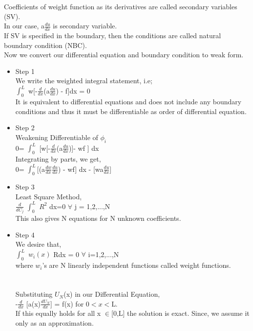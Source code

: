 \documentclass{article}
\begin{document}
	
	Coefficients of weight function as its derivatives are called secondary variables (SV).\\
	In our case, a$\frac{du}{dx}$ is secondary variable.\\
	If SV is specified in the boundary, then the conditions are called natural boundary condition (NBC).\\
	Now we convert our differential equation and boundary condition to weak form.\\
	\begin{itemize}
		\item Step 1\\
		   We write the weighted integral statement, i.e;\\
		   $\int_{0}^{L}$ w[-$\frac{d}{dx}$(a$\frac{du}{dx}$) - f]dx = 0\\
		   It is equivalent to differential equations and does not include any boundary conditions and thus it must be differentiable as order of differential equation.
		 \item Step 2\\
		 Weakening Differentiable of $\phi_{i}$\\
		 0= $\int_{0}^{L}$ [w[-$\frac{d}{dx}$(a$\frac{du}{dx}$)]- wf ] dx\\
		 Integrating by parts, we get,\\
		 0= $\int_{0}^{L}$[(a$\frac{dw}{dx}$$\frac{du}{dx}$) - wf] dx - [wa$\frac{du}{dx}$]\\
		 \item Step 3\\
		 Least Square Method,\\
		 $\frac{d}{dC_j}$ $\int_{0}^{L}$ $R^2$ dx=0 $\forall$ j = 1,2,...,N\\
		 This also gives N equations for N unknown coefficients.\\
		 \item Step 4\\
		 We desire that,\\
		 $\int_{0}^{L}$ $w_i(x)$ Rdx =  0 $\forall$ i=1,2,...,N\\
		 where $w_i$'s are N linearly independent functions called weight functions.\\
		 \\
		 \\
		 Substituting  $U_N$(x) in our Differential Equation,\\
		 -$\frac{d}{dx}$ [a(x)$\frac{dU_N}{dx}$] = f(x) for 0$<x<$L.\\
		 If this equally holds for all x $\in$[0,L] the solution is exact. Since, we assume it only as an approximation.\\
$$
\end{itemize}
\end{document}

